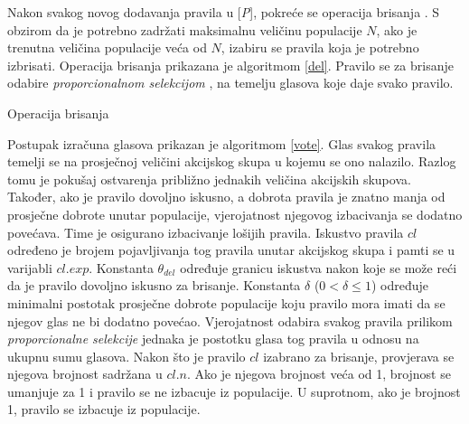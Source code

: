 \documentclass[times, utf8, zavrsni]{fer}
\begin{document}
Nakon svakog novog dodavanja pravila u [\emph{P}], pokreće se operacija brisanja \citep{1}.
S obzirom da je potrebno zadržati maksimalnu veličinu populacije $N$, ako je trenutna veličina populacije veća od $N$, izabiru se pravila koja je potrebno izbrisati.
Operacija brisanja prikazana je algoritmom \ref{del}.
Pravilo se za brisanje odabire \emph{proporcionalnom selekcijom} , na temelju glasova koje daje svako pravilo.
\begin{algorithm}
    \caption{Operacija brisanja}
    \label{del}
    \begin{algorithmic}
        \RETURN
        \ENDIF
        \ENDFOR
        \STATE{$r$ := proizvoljan decimalni broj iz intervala [0, 1)}
        \ELSE
        \ENDIF
        \RETURN
        \ENDIF
        \ENDFOR
    \end{algorithmic}
\end{algorithm}
Postupak izračuna glasova prikazan je algoritmom \ref{vote}.
Glas svakog pravila temelji se na prosječnoj veličini akcijskog skupa u kojemu se ono nalazilo.
Razlog tomu je pokušaj ostvarenja približno jednakih veličina akcijskih skupova.
Također, ako je pravilo dovoljno iskusno, a dobrota pravila je znatno manja od prosječne dobrote unutar populacije, vjerojatnost njegovog izbacivanja se dodatno povećava.
Time je osigurano izbacivanje lošijih pravila.
Iskustvo pravila $cl$ određeno je brojem pojavljivanja tog pravila unutar akcijskog skupa i pamti se u varijabli $cl.exp$.
Konstanta $\theta_{del}$ određuje granicu iskustva nakon koje se može reći da je pravilo dovoljno iskusno za brisanje.
Konstanta $\delta$ ($0 < \delta \leq 1$) određuje minimalni postotak prosječne dobrote populacije koju pravilo mora imati da se njegov glas ne bi dodatno povećao.
Vjerojatnost odabira svakog pravila prilikom \emph{proporcionalne selekcije} jednaka je postotku glasa tog pravila u odnosu na ukupnu sumu glasova.
Nakon što je pravilo $cl$ izabrano za brisanje, provjerava se njegova brojnost sadržana u $cl.n$.
Ako je njegova brojnost veća od 1, brojnost se umanjuje za 1 i pravilo se ne izbacuje iz populacije.
U suprotnom, ako je brojnost 1, pravilo se izbacuje iz populacije.
\end{document}
